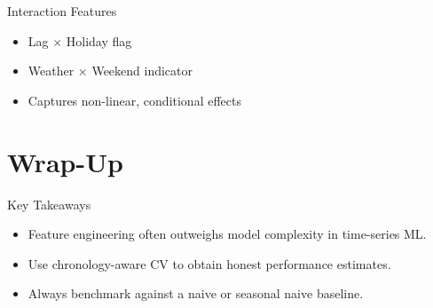 \documentclass[11pt,compress,t,notes=noshow, xcolor=table]{beamer}
\begin{document}
\begin{vbframe}{Interaction Features}
  \vfill
  \begin{itemize}
    \item Lag $\times$ Holiday flag
    \item Weather $\times$ Weekend indicator
    \item Captures non-linear, conditional effects
  \end{itemize}
  \vfill
\end{vbframe}

\section{Wrap-Up}
\begin{vbframe}{Key Takeaways}
  \vfill
  \begin{itemize}
    \item Feature engineering often outweighs model complexity in time-series ML.
    \item Use chronology-aware CV to obtain honest performance estimates.
    \item Always benchmark against a naive or seasonal naive baseline.
  \end{itemize}
  \vfill
\end{vbframe}


\endlecture
\end{document}
